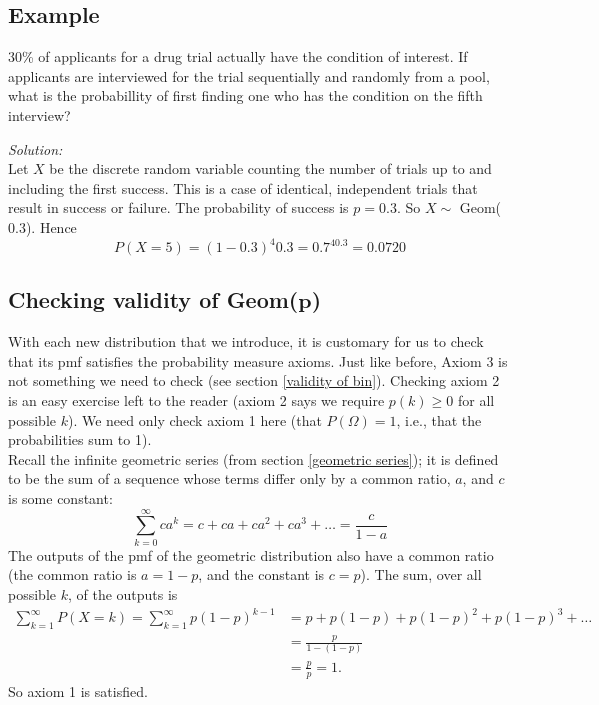 \subsection{Example}
30\% of applicants for a drug trial actually have the condition of interest. If applicants are interviewed for the trial sequentially and randomly from a pool, what is the probabillity of first finding one who has the condition on the fifth interview?

\noindent \textit{Solution:} \\
Let $X$ be the discrete random variable counting the number of trials up to and including the first success. This is a case of identical, independent trials that result in success or failure. The probability of success is $p = 0.3$. So $X \sim $ Geom($0.3$). Hence
\[
P(X = 5) = (1-0.3)^{4}0.3 = 0.7^40.3 = 0.0720
\]

\subsection{Checking validity of Geom($\boldsymbol{p}$)}
With each new distribution that we introduce, it is customary for us to check that its pmf satisfies the probability measure axioms. Just like before, Axiom 3 is not something we need to check (see section \ref{validity of bin}). Checking axiom 2 is an easy exercise left to the reader (axiom 2 says we require $p(k) \geq 0$ for all possible $k$). We need only check axiom 1 here (that $P(\Omega) = 1$, i.e., that the probabilities sum to 1). \\

\noindent Recall the infinite geometric series (from section \ref{geometric series}); it is defined to be the sum of a sequence whose terms differ only by a common ratio, $a$, and $c$ is some constant:
\[
\sum_{k=0}^\infty ca^k = c + ca + ca^2 + ca^3 + \ldots = \frac{c}{1-a} \tag{$\bigstar$}
\]
The outputs of the pmf of the geometric distribution also have a common ratio (the common ratio is $a = 1-p$, and the constant is $c = p$). The sum, over all possible $k$, of the outputs is
\begin{align*}
\sum_{k=1}^\infty P(X = k) = \sum_{k=1}^\infty p(1-p)^{k-1} & = p + p(1-p) + p(1-p)^2 + p(1-p)^3 + \ldots \\
	& = \frac{p}{1-(1-p)} \tag{by the formula ($\bigstar$) above} \\
	& = \frac{p}{p} = 1.
\end{align*}
So axiom 1 is satisfied.

